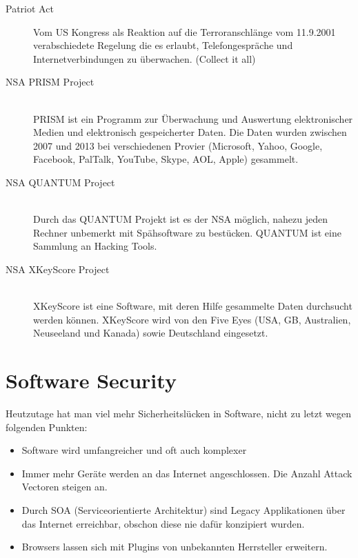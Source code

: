 \begin{description}
	\item[Patriot Act] Vom US Kongress als Reaktion auf die Terroranschlänge vom 11.9.2001 verabschiedete Regelung die es erlaubt, Telefongespräche und Internetverbindungen zu überwachen. (Collect it all)
	\item[NSA PRISM Project] \hfill \\
	PRISM ist ein Programm zur Überwachung und Auswertung elektronischer Medien und elektronisch gespeicherter Daten. Die Daten wurden zwischen 2007 und 2013 bei verschiedenen Provier (Microsoft, Yahoo, Google, Facebook, PalTalk, YouTube, Skype, AOL, Apple) gesammelt.
	\item[NSA QUANTUM Project] \hfill \\
	Durch das QUANTUM Projekt ist es der NSA möglich, nahezu jeden Rechner unbemerkt mit Spähsoftware zu bestücken. QUANTUM ist eine Sammlung an Hacking Tools.
	\item[NSA XKeyScore Project] \hfill \\
	XKeyScore ist eine Software, mit deren Hilfe gesammelte Daten durchsucht werden können. XKeyScore wird von den Five Eyes (USA, GB, Australien, Neuseeland und Kanada) sowie Deutschland eingesetzt.
\end{description}

\section{Software Security}
Heutzutage hat man viel mehr Sicherheitslücken in Software, nicht zu letzt wegen folgenden Punkten:
\begin{itemize}
	\item Software wird umfangreicher und oft auch komplexer
	\item Immer mehr Geräte werden an das Internet angeschlossen. Die Anzahl Attack Vectoren steigen an. 
	\item Durch SOA (Serviceorientierte Architektur) sind Legacy Applikationen über das Internet erreichbar, obschon diese nie dafür konzipiert wurden.
	\item Browsers lassen sich mit Plugins von unbekannten Herrsteller erweitern.
\end{itemize}

